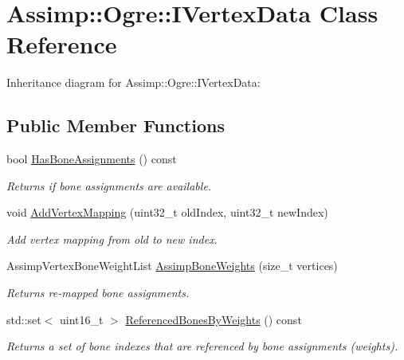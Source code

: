 \hypertarget{class_assimp_1_1_ogre_1_1_i_vertex_data}{\section{Assimp\+:\+:Ogre\+:\+:I\+Vertex\+Data Class Reference}
\label{class_assimp_1_1_ogre_1_1_i_vertex_data}
}


Inheritance diagram for Assimp\+:\+:Ogre\+:\+:I\+Vertex\+Data\+:
\subsection*{Public Member Functions}
\begin{DoxyCompactItemize}
\item 
\hypertarget{class_assimp_1_1_ogre_1_1_i_vertex_data_a555ac2e680cb12a7a0a2c8a2eb3df973}{bool \hyperlink{class_assimp_1_1_ogre_1_1_i_vertex_data_a555ac2e680cb12a7a0a2c8a2eb3df973}{Has\+Bone\+Assignments} () const }\label{class_assimp_1_1_ogre_1_1_i_vertex_data_a555ac2e680cb12a7a0a2c8a2eb3df973}

\begin{DoxyCompactList}\small\item\em Returns if bone assignments are available. \end{DoxyCompactList}\item 
\hypertarget{class_assimp_1_1_ogre_1_1_i_vertex_data_ad15bb1b0728e23923b32a2a9021a66d1}{void \hyperlink{class_assimp_1_1_ogre_1_1_i_vertex_data_ad15bb1b0728e23923b32a2a9021a66d1}{Add\+Vertex\+Mapping} (uint32\+\_\+t old\+Index, uint32\+\_\+t new\+Index)}\label{class_assimp_1_1_ogre_1_1_i_vertex_data_ad15bb1b0728e23923b32a2a9021a66d1}

\begin{DoxyCompactList}\small\item\em Add vertex mapping from old to new index. \end{DoxyCompactList}\item 
Assimp\+Vertex\+Bone\+Weight\+List \hyperlink{class_assimp_1_1_ogre_1_1_i_vertex_data_a85abc52b69b77582398a499f5296ceee}{Assimp\+Bone\+Weights} (size\+\_\+t vertices)
\begin{DoxyCompactList}\small\item\em Returns re-\/mapped bone assignments. \end{DoxyCompactList}\item 
\hypertarget{class_assimp_1_1_ogre_1_1_i_vertex_data_a82c9a8c374fd12790b47a835a52e3d95}{std\+::set$<$ uint16\+\_\+t $>$ \hyperlink{class_assimp_1_1_ogre_1_1_i_vertex_data_a82c9a8c374fd12790b47a835a52e3d95}{Referenced\+Bones\+By\+Weights} () const }\label{class_assimp_1_1_ogre_1_1_i_vertex_data_a82c9a8c374fd12790b47a835a52e3d95}

\begin{DoxyCompactList}\small\item\em Returns a set of bone indexes that are referenced by bone assignments (weights). \end{DoxyCompactList}\end{DoxyCompactItemize}
